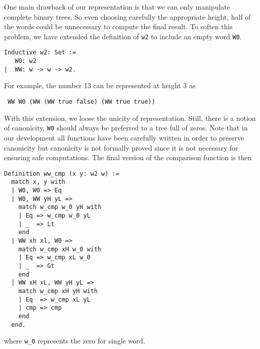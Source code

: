 One main drawback of our representation is that we can only manipulate
complete binary trees. So even choosing
carefully the appropriate height, half of the words could be unnecessary 
to compute the final result. 
To soften this problem, we have extended the definition of {\tt w2} to include an
empty word {\tt W0}. 
\begin{verbatim}
Inductive w2: Set :=  
   W0: w2
|  WW: w -> w -> w2.
\end{verbatim}
For example, the number 13 can be represented at height 3 as
\begin{verbatim}
 WW W0 (WW (WW true false) (WW true true))
\end{verbatim}
With this extension, we loose the unicity of representation. Still, there is a notion
of canonicity, {\tt W0} should always be preferred to a tree full of zeros. Note that in
our development all functions have been carefully written in order to preserve canonicity but
canonicity  is not formally proved since it is not necessary for ensuring safe computations.
The final version of the comparison function is then
\begin{verbatim}
Definition ww_cmp (x y: w2 w) :=
  match x, y with
  | W0, W0 => Eq
  | W0, WW yH yL =>
    match w_cmp w_0 yH with
    | Eq => w_cmp w_0 yL
    | _  => Lt
    end
  | WW xh xl, W0 =>
    match w_cmp xH w_0 with
    | Eq => w_cmp xL w_0
    | _  => Gt
    end
  | WW xH xL, WW yH yL =>
    match w_cmp xH yH with
    | Eq  => w_cmp xL yL
    | cmp => cmp
    end
  end.
\end{verbatim}
where {\tt w\_0} represents the zero for single word.

